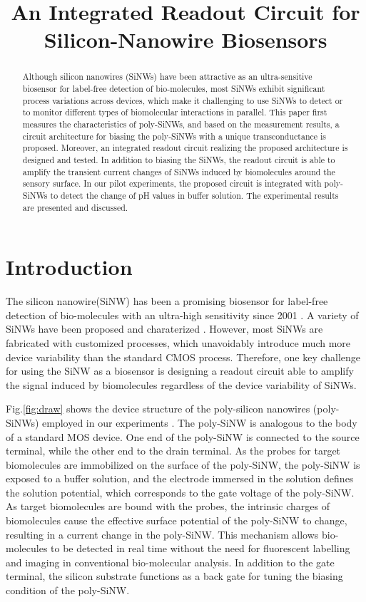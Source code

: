 \documentclass{article}
\title{An Integrated Readout Circuit for Silicon-Nanowire Biosensors}
\begin{document}
%
\maketitle
%
\begin{abstract}
Although silicon nanowires (SiNWs) have been attractive as an ultra-sensitive
biosensor for label-free detection of bio-molecules,
most SiNWs exhibit significant process variations across devices,
which make it challenging to use SiNWs to detect or to monitor different types of biomolecular interactions in parallel.
This paper first measures the characteristics of poly-SiNWs,
and based on the measurement results, a circuit architecture for biasing the poly-SiNWs
with a unique transconductance is proposed.
Moreover, an integrated readout circuit realizing the proposed architecture is designed and tested.
In addition to biasing the SiNWs, the readout circuit is able to amplify the transient current changes
of SiNWs induced by biomolecules around the sensory surface.
In our pilot experiments, the proposed circuit is integrated with poly-SiNWs to detect the change of pH values in buffer solution.
The experimental results are presented and discussed.
\end{abstract}
%
\section{Introduction}
\label{sec:intro}
The silicon nanowire(SiNW) has been a promising biosensor
for label-free detection of bio-molecules with an ultra-high sensitivity since 2001 \cite{C2001}.
A variety of SiNWs have been proposed and charaterized \cite{C25th}.
However, most SiNWs are fabricated with customized processes,
which unavoidably introduce much more device variability than the standard CMOS process.
Therefore, one key challenge for using the SiNW as a biosensor is
designing a readout circuit able to amplify the signal induced by biomolecules
regardless of the device variability of SiNWs.

Fig.\ref{fig:draw} shows the device structure of the poly-silicon nanowires (poly-SiNWs)
employed in our experiments \cite{J7}. The poly-SiNW is analogous
to the body of a standard MOS device. One end of the poly-SiNW is connected to the source terminal,
while the other end to the drain terminal. As the probes for target biomolecules are immobilized on
the surface of the poly-SiNW, the poly-SiNW is exposed to a buffer solution,
and the electrode immersed in the solution defines the solution potential,
which corresponds to the gate voltage of the poly-SiNW.
As target biomolecules are bound with the probes, the intrinsic charges of biomolecules
cause the effective surface potential of the poly-SiNW to change,
resulting in a current change in the poly-SiNW.
This mechanism allows bio-molecules to be detected in real time without the need
for fluorescent labelling and imaging in conventional bio-molecular analysis.
In addition to the gate terminal, the silicon substrate functions as a back gate for
tuning the biasing condition of the poly-SiNW.
\end{document}
